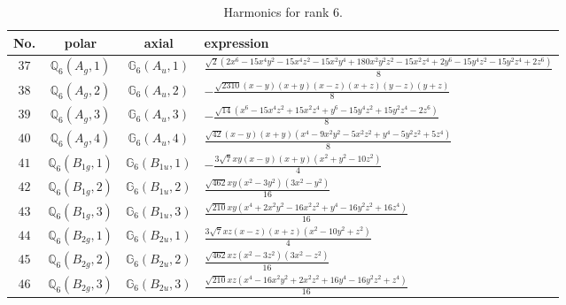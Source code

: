 \documentclass[fleqn,8pt,landscape]{jsarticle}
\begin{document}
\begin{table}[ht!]
\begin{center}
\caption{Harmonics for rank 6.}
\renewcommand{\arraystretch}{1.3}
\begin{tabular}{cccl} \hline \hline
No. & polar & axial & expression \\ \hline
$ 37 $ & $ \mathbb{Q}_{6}(A_{g},1) $ & $ \mathbb{G}_{6}(A_{u},1) $ & $ \frac{\sqrt{2} \left(2 x^{6} - 15 x^{4} y^{2} - 15 x^{4} z^{2} - 15 x^{2} y^{4} + 180 x^{2} y^{2} z^{2} - 15 x^{2} z^{4} + 2 y^{6} - 15 y^{4} z^{2} - 15 y^{2} z^{4} + 2 z^{6}\right)}{8} $ \\
$ 38 $ & $ \mathbb{Q}_{6}(A_{g},2) $ & $ \mathbb{G}_{6}(A_{u},2) $ & $ - \frac{\sqrt{2310} \left(x - y\right) \left(x + y\right) \left(x - z\right) \left(x + z\right) \left(y - z\right) \left(y + z\right)}{8} $ \\
$ 39 $ & $ \mathbb{Q}_{6}(A_{g},3) $ & $ \mathbb{G}_{6}(A_{u},3) $ & $ - \frac{\sqrt{14} \left(x^{6} - 15 x^{4} z^{2} + 15 x^{2} z^{4} + y^{6} - 15 y^{4} z^{2} + 15 y^{2} z^{4} - 2 z^{6}\right)}{8} $ \\
$ 40 $ & $ \mathbb{Q}_{6}(A_{g},4) $ & $ \mathbb{G}_{6}(A_{u},4) $ & $ \frac{\sqrt{42} \left(x - y\right) \left(x + y\right) \left(x^{4} - 9 x^{2} y^{2} - 5 x^{2} z^{2} + y^{4} - 5 y^{2} z^{2} + 5 z^{4}\right)}{8} $ \\
$ 41 $ & $ \mathbb{Q}_{6}(B_{1g},1) $ & $ \mathbb{G}_{6}(B_{1u},1) $ & $ - \frac{3 \sqrt{7} x y \left(x - y\right) \left(x + y\right) \left(x^{2} + y^{2} - 10 z^{2}\right)}{4} $ \\
$ 42 $ & $ \mathbb{Q}_{6}(B_{1g},2) $ & $ \mathbb{G}_{6}(B_{1u},2) $ & $ \frac{\sqrt{462} x y \left(x^{2} - 3 y^{2}\right) \left(3 x^{2} - y^{2}\right)}{16} $ \\
$ 43 $ & $ \mathbb{Q}_{6}(B_{1g},3) $ & $ \mathbb{G}_{6}(B_{1u},3) $ & $ \frac{\sqrt{210} x y \left(x^{4} + 2 x^{2} y^{2} - 16 x^{2} z^{2} + y^{4} - 16 y^{2} z^{2} + 16 z^{4}\right)}{16} $ \\
$ 44 $ & $ \mathbb{Q}_{6}(B_{2g},1) $ & $ \mathbb{G}_{6}(B_{2u},1) $ & $ \frac{3 \sqrt{7} x z \left(x - z\right) \left(x + z\right) \left(x^{2} - 10 y^{2} + z^{2}\right)}{4} $ \\
$ 45 $ & $ \mathbb{Q}_{6}(B_{2g},2) $ & $ \mathbb{G}_{6}(B_{2u},2) $ & $ \frac{\sqrt{462} x z \left(x^{2} - 3 z^{2}\right) \left(3 x^{2} - z^{2}\right)}{16} $ \\
$ 46 $ & $ \mathbb{Q}_{6}(B_{2g},3) $ & $ \mathbb{G}_{6}(B_{2u},3) $ & $ \frac{\sqrt{210} x z \left(x^{4} - 16 x^{2} y^{2} + 2 x^{2} z^{2} + 16 y^{4} - 16 y^{2} z^{2} + z^{4}\right)}{16} $ \\

\end{tabular}
\end{center}
\end{table}
\end{document}
